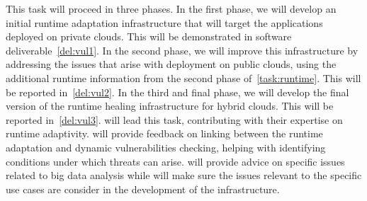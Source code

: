 \begin{Workpackage}{\thewpno}
\begin{Task}
This task will proceed in three phases. In the first phase, we will develop an initial runtime adaptation infrastructure that will target the applications deployed on private clouds. This will be demonstrated in software deliverable~\ref{del:vul1}. In the second phase, we will improve this infrastructure by addressing the issues that arise with deployment on public clouds, using the additional runtime information from the second phase of~\ref{task:runtime}. This will be reported in~\ref{del:vul2}. In the third and final phase, we will develop the final version of the runtime healing infrastructure for hybrid clouds. This will be reported in~\ref{del:vul3}. \SCCHshort{} will lead this task, contributing with their expertise on runtime adaptivity. \IBMshort{} will provide feedback on linking between the runtime adaptation and dynamic vulnerabilities checking, helping with identifying conditions under which threats can arise. \UODshort{} will provide advice on specific issues related to big data analysis while \SOPRAshort{} will make sure the issues relevant to the specific use cases are consider in the development of the infrastructure.
\end{Task}



\end{Workpackage}
